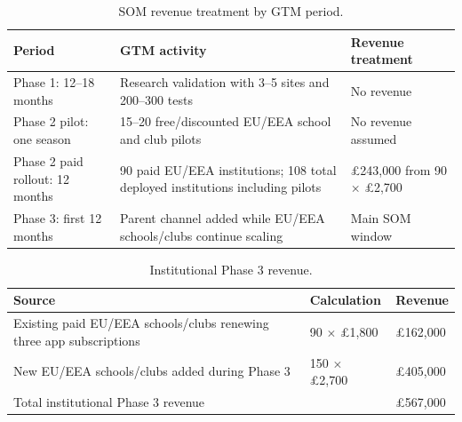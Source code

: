 \begin{table}[htbp]
    \centering
    \footnotesize
    \caption{SOM revenue treatment by GTM period.}
    \label{tab:ent-som-periods}
    \begin{tabular}{p{3.4cm}p{6.8cm}p{4.0cm}}
        \toprule
        \textbf{Period} & \textbf{GTM activity} & \textbf{Revenue treatment} \\
        \midrule
        Phase 1: 12--18 months & Research validation with 3--5 sites and 200--300 tests & No revenue \\
        Phase 2 pilot: one season & 15--20 free/discounted EU/EEA school and club pilots & No revenue assumed \\
        Phase 2 paid rollout: 12 months & 90 paid EU/EEA institutions; 108 total deployed institutions including pilots & \pounds{}243,000 from 90 $\times$ \pounds{}2,700 \\
        Phase 3: first 12 months & Parent channel added while EU/EEA schools/clubs continue scaling & Main SOM window \\
        \bottomrule
    \end{tabular}
\end{table}

\begin{table}[htbp]
    \centering
    \footnotesize
    \caption{Institutional Phase 3 revenue.}
    \label{tab:ent-som-institutional}
    \begin{tabular}{p{7.4cm}p{3.2cm}p{2.8cm}}
        \toprule
        \textbf{Source} & \textbf{Calculation} & \textbf{Revenue} \\
        \midrule
        Existing paid EU/EEA schools/clubs renewing three app subscriptions & 90 $\times$ \pounds{}1,800 & \pounds{}162,000 \\
        New EU/EEA schools/clubs added during Phase 3 & 150 $\times$ \pounds{}2,700 & \pounds{}405,000 \\
        \midrule
        Total institutional Phase 3 revenue & & \pounds{}567,000 \\
        \bottomrule
    \end{tabular}
\end{table}

